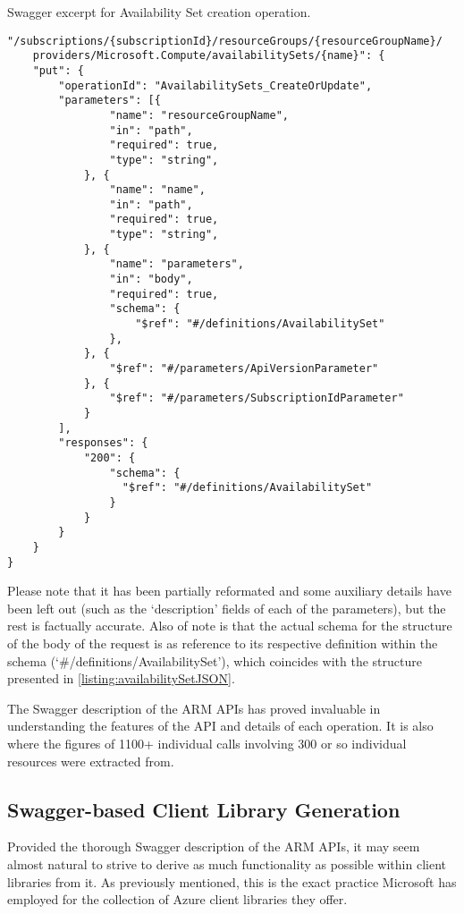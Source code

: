 \documentclass[11pt]{report}
\begin{document}
\begin{listing}[H]
\caption{Swagger excerpt for Availability Set creation operation.}
\label{listing:availabilitySetCreateSwagger}
\begin{verbatim}
"/subscriptions/{subscriptionId}/resourceGroups/{resourceGroupName}/
    providers/Microsoft.Compute/availabilitySets/{name}": {
    "put": {
        "operationId": "AvailabilitySets_CreateOrUpdate",
        "parameters": [{
                "name": "resourceGroupName",
                "in": "path",
                "required": true,
                "type": "string",
            }, {
                "name": "name",
                "in": "path",
                "required": true,
                "type": "string",
            }, {
                "name": "parameters",
                "in": "body",
                "required": true,
                "schema": {
                    "$ref": "#/definitions/AvailabilitySet"
                },
            }, {
                "$ref": "#/parameters/ApiVersionParameter"
            }, {
                "$ref": "#/parameters/SubscriptionIdParameter"
            }
        ],
        "responses": {
            "200": {
                "schema": {
                  "$ref": "#/definitions/AvailabilitySet"
                }
            }
        }
    }
}
\end{verbatim}
\end{listing}
\newpage

Please note that it has been partially reformated and some auxiliary details
have been left out (such as the `description' fields of each of the
parameters), but the rest is factually accurate. Also of note is that the
actual schema for the structure of the body of the request is as reference to
its respective definition within the schema (`\#/definitions/AvailabilitySet'),
which coincides with the structure presented in
\ref{listing:availabilitySetJSON}.


The Swagger description of the ARM APIs has proved invaluable in understanding
the features of the API and details of each operation. It is also where the
figures of 1100+ individual calls involving 300 or so individual resources were
extracted from.

\subsection{Swagger-based Client Library Generation}

Provided the thorough Swagger description of the ARM APIs, it may seem almost
natural to strive to derive as much functionality as possible within client
libraries from it. As previously mentioned, this is the exact practice
Microsoft has employed for the collection of Azure client libraries they offer.
\end{document}
